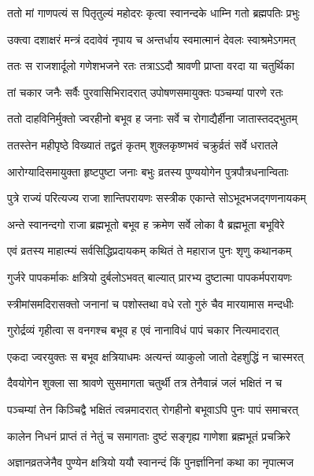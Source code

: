 \twolineshloka
{ततो मां गाणपत्यं स पितृतुल्यं महोदरः}
{कृत्वा स्वानन्दके धाम्नि गतो ब्रह्मपतिः प्रभुः} %

\twolineshloka
{उक्त्वा दशाक्षरं मन्त्रं ददावेवं नृपाय च}
{अन्तर्धाय स्वमात्मानं देवलः स्वाश्रमेऽगमत्} %

\twolineshloka
{ततः स राजशार्दूलो गणेशभजने रतः}
{तत्राऽऽदौ श्रावणी प्राप्ता वरदा या चतुर्थिका} %

\twolineshloka
{तां चकार जनैः सर्वैः पुरवासिभिरादरात्}
{उपोषणसमायुक्तः पञ्चम्यां पारणे रतः} %

\twolineshloka
{ततो दाहविनिर्मुक्तो ज्वरहीनो बभूव ह}
{जनाः सर्वे च रोगाद्यैर्हीना जातास्तदद्भुतम्} %

\twolineshloka
{ततस्तेन महीपृष्ठे विख्यातं तद्व्रतं कृतम्}
{शुक्लकृष्णभवं चक्रुर्व्रतं सर्वे धरातले} %

\twolineshloka
{आरोग्यादिसमायुक्ता हृष्टपुष्टा जनाः बभुः}
{व्रतस्य पुण्ययोगेन पुत्रपौत्रधनान्विताः} %

\twolineshloka
{पुत्रे राज्यं परित्यज्य राजा शान्तिपरायणः}
{सस्त्रीक एकान्ते सोऽभूदभजद्गणनायकम्} %

\twolineshloka
{अन्ते स्वानन्दगो राजा ब्रह्मभूतो बभूव ह}
{क्रमेण सर्वे लोका वै ब्रह्मभूता बभूविरे} %

\twolineshloka
{एवं व्रतस्य माहात्म्यं सर्वसिद्धिप्रदायकम्}
{कथितं ते महाराज पुनः श‍ृणु कथानकम्} %

\twolineshloka
{गुर्जरे पापकर्माकः क्षत्रियो दुर्बलोऽभवत्}
{बाल्यात् प्रारभ्य दुष्टात्मा पापकर्मपरायणः} %

\twolineshloka
{स्त्रीमांसमदिरासक्तो जनानां च पशोस्तथा}
{वधे रतो गुरुं चैव मारयामास मन्दधीः} %

\twolineshloka
{गुरोर्द्रव्यं गृहीत्वा स वनगश्च बभूव ह}
{एवं नानाविधं पापं चकार नित्यमादरात्} %

\twolineshloka
{एकदा ज्वरयुक्तः स बभूव क्षत्रियाधमः}
{अत्यन्तं व्याकुलो जातो देहशुद्धिं न चास्मरत्} %

\twolineshloka
{दैवयोगेन शुक्ला सा श्रावणे सुसमागता}
{चतुर्थी तत्र तेनैवान्नं जलं भक्षितं न च} %

\twolineshloka
{पञ्चम्यां तेन किञ्चिद्वै भक्षितं त्वन्नमादरात्}
{रोगहीनो बभूवाऽपि पुनः पापं समाचरत्} %

\twolineshloka
{कालेन निधनं प्राप्तं तं नेतुं च समागताः}
{दुष्टं सङ्गृह्य गाणेशा ब्रह्मभूतं प्रचक्रिरे} %

\twolineshloka
{अज्ञानव्रतजेनैव पुण्येन क्षत्रियो ययौ}
{स्वानन्दं किं पुनर्ज्ञानिनां कथा का नृपात्मज} %

